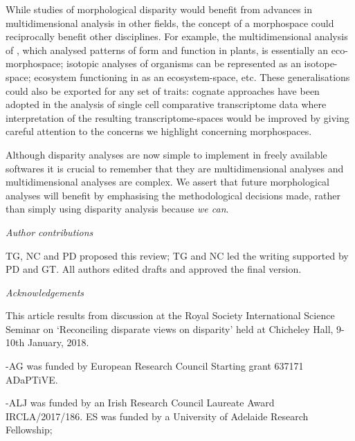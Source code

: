 \documentclass[12pt,letterpaper]{article}
\renewcommand{\subsection}[1]{%
\bigskip
\begin{center}
\begin{large}
\normalfont\itshape #1
\end{large}
\end{center}}
\begin{document}
While studies of morphological disparity would benefit from advances in multidimensional analysis in other fields, the concept of a morphospace could reciprocally benefit other disciplines.
For example, the multidimensional analysis of \citep{Diaz2016-mr}, which analysed patterns of form and function in plants, is essentially an eco-morphospace; isotopic analyses of organisms \citep{Jackson2011-kq,Swanson2015} can be represented as an isotope-space; ecosystem functioning in \citealt{Donohue2013-bg} as an ecosystem-space, etc.
These generalisations could also be exported for any set of traits: cognate approaches have been adopted in the analysis of single cell comparative transcriptome data \citep{Sebe-Pedros2018-sw} where interpretation of the resulting transcriptome-spaces would be improved by giving careful attention to the concerns we highlight concerning morphospaces.

Although disparity analyses are now simple to implement in freely available softwares \citep{Navarro2003-vz, Bouxin2005-wk, oksanen2007vegan, Harmon2008-gq, lloyd2016, Guillerme2018-uc} it is crucial to remember that they are multidimensional analyses and multidimensional analyses are complex.
We assert that future morphological analyses will benefit by emphasising the methodological decisions made, rather than simply using disparity analysis because \textit{we can}.

\subsection{Author contributions}

TG, NC and PD proposed this review; TG and NC led the writing supported by PD and GT. All authors edited drafts and approved the final version.

\subsection{Acknowledgements}

This article results from discussion at the Royal Society International Science Seminar on `Reconciling disparate views on disparity' held at Chicheley Hall, 9-10th January, 2018.

-AG was funded by European Research Council Starting grant 637171 ADaPTiVE.

-ALJ was funded by an Irish Research Council Laureate Award IRCLA/2017/186. ES was funded by a University of Adelaide Research Fellowship;
\end{document}
